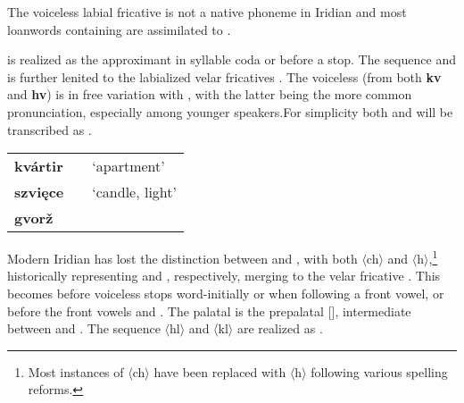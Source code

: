 The voiceless labial fricative  is not a native phoneme in Iridian and most loanwords containing  are assimilated to .

\xe

\par {} is realized as the approximant  in syllable coda or before a stop. The sequence  and  is further lenited to the labialized velar fricatives . The voiceless  (from both \textbf{kv} and \textbf{hv}) is in free variation with , with the latter being the more common pronunciation, especially among younger speakers.For simplicity both  and  will be transcribed as .
\ex
{\small
	\begin{tabularx}{0.8\textwidth}{>{\bfseries}YYY}
		kvártir		&  			& `apartment'\\
		szvi\k{e}ce		& 	& `candle, light'\\
		gvor\v{z}	&&\\
	\end{tabularx}}
\xe

\par Modern Iridian has lost the distinction between  and , with both $\langle$ch$\rangle$ and $\langle$h$\rangle$,\footnote{Most instances of $\langle$ch$\rangle$ have been replaced with $\langle$h$\rangle$ following various spelling reforms.} historically representing  and , respectively, merging to the velar fricative . This becomes  before voiceless stops word-initially or when following a front vowel, or before the front vowels  and . The palatal  is the prepalatal [], intermediate between  and . The sequence $\langle$hl$\rangle$ and $\langle$kl$\rangle$ are realized as .

\xe

